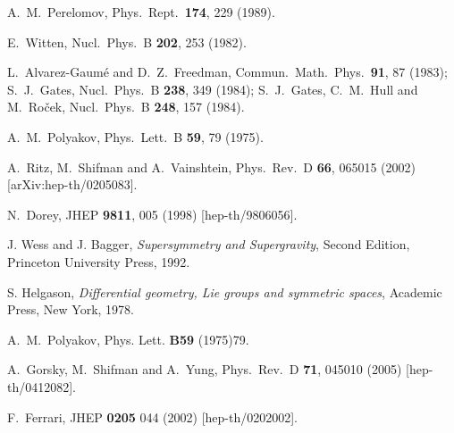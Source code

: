 \documentclass[epsfig,12pt]{article}
\begin{document}
{\begin{thebibliography}{99}
 A.~M.~Perelomov,
  Phys.\ Rept.\  {\bf 174}, 229 (1989).
  
  E.~Witten,
  Nucl.\ Phys.\  B {\bf 202}, 253 (1982).
  
 L.~Alvarez-Gaum\'{e} and D.~Z.~Freedman,
Commun.\ Math.\ Phys.\  {\bf 91}, 87 (1983);
S.~J.~Gates,
Nucl.\ Phys.\ B {\bf 238}, 349 (1984);
S.~J.~Gates, C.~M.~Hull and M.~Ro\v{c}ek,
Nucl.\ Phys.\ B {\bf 248}, 157 (1984).

 A.~M.~Polyakov,
  Phys.\ Lett.\  B {\bf 59}, 79 (1975).
  
  A.~Ritz, M.~Shifman and A.~Vainshtein,
  Phys.\ Rev.\  D {\bf 66}, 065015 (2002)
  [arXiv:hep-th/0205083].
  
N.~Dorey,
JHEP {\bf 9811}, 005 (1998) [hep-th/9806056].
  
J. Wess and J. Bagger, {\em Supersymmetry and Supergravity}, Second Edition,
Princeton University Press, 1992.

S. Helgason, {\em Differential geometry, Lie groups and symmetric spaces},
Academic Press, New York, 1978.

A.~M.~Polyakov,
Phys. Lett. {\bf B59} (1975)79.



A.~Gorsky, M.~Shifman and A.~Yung,
Phys.\ Rev.\ D {\bf 71}, 045010 (2005)
[hep-th/0412082].


F.~Ferrari,
JHEP {\bf 0205} 044 (2002)
[hep-th/0202002].


\end{thebibliography}}
\end{document}
